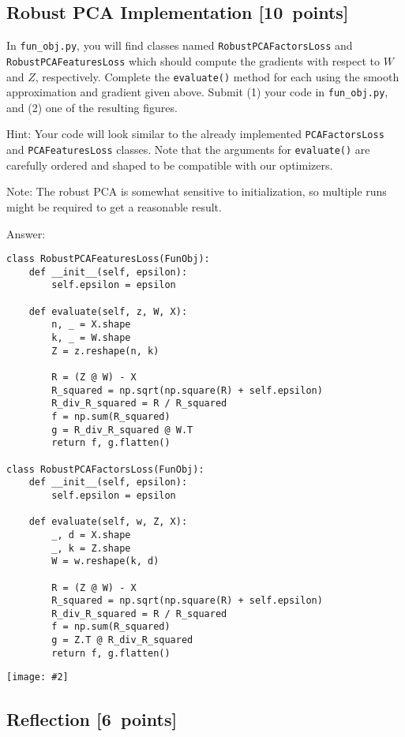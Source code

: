 \documentclass{article}
\newcommand{\blu}[1]{{\textcolor{blu}{#1}}}
\newcommand{\gre}[1]{\textcolor{gre}{#1}}
\newcommand\ans[1]{\par\gre{Answer: #1}}
\let\ask\blu
\newcommand\pts[1]{\textcolor{pointscolour}{[#1~points]}}
\newcommand{\centerfig}[2]{\begin{center}\texttt{[image: \#2]}\end{center}}
\begin{document}
\subsection{Robust PCA Implementation \pts{10}}

In \texttt{fun\_obj.py}, you will find classes named \texttt{RobustPCAFactorsLoss} and \texttt{RobustPCAFeaturesLoss} which should compute the gradients with respect to $W$ and $Z$, respectively. \ask{Complete the \texttt{evaluate()} method for each using the smooth approximation and gradient given above. Submit (1) your code in \texttt{fun\_obj.py}, and (2) one of the resulting figures.}

Hint: Your code will look similar to the already implemented \texttt{PCAFactorsLoss} and \texttt{PCAFeaturesLoss} classes. Note that the arguments for \texttt{evaluate()} are carefully ordered and shaped to be compatible with our optimizers.

Note: The robust PCA is somewhat sensitive to initialization, so multiple runs might be required to get a reasonable result.
\newpage
\ans{}
\begin{verbatim}
class RobustPCAFeaturesLoss(FunObj):
    def __init__(self, epsilon):
        self.epsilon = epsilon

    def evaluate(self, z, W, X):
        n, _ = X.shape
        k, _ = W.shape
        Z = z.reshape(n, k)

        R = (Z @ W) - X
        R_squared = np.sqrt(np.square(R) + self.epsilon)
        R_div_R_squared = R / R_squared
        f = np.sum(R_squared)
        g = R_div_R_squared @ W.T
        return f, g.flatten()

class RobustPCAFactorsLoss(FunObj):
    def __init__(self, epsilon):
        self.epsilon = epsilon

    def evaluate(self, w, Z, X):
        _, d = X.shape
        _, k = Z.shape
        W = w.reshape(k, d)

        R = (Z @ W) - X
        R_squared = np.sqrt(np.square(R) + self.epsilon)
        R_div_R_squared = R / R_squared
        f = np.sum(R_squared)
        g = Z.T @ R_div_R_squared
        return f, g.flatten()
\end{verbatim}

\centerfig{1}{./figs/robustpca_highway_000.jpg}
\newpage
\subsection{Reflection \pts{6}}
\end{document}
